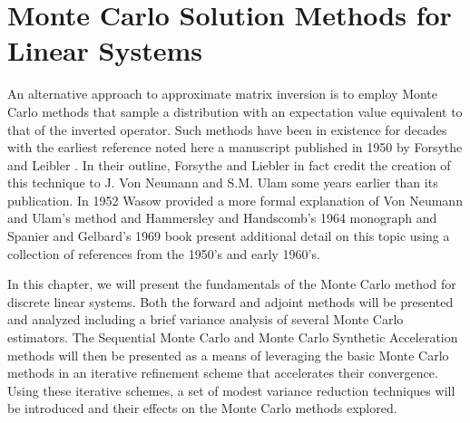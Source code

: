 \chapter{Monte Carlo Solution Methods for Linear Systems}
\label{ch:stochastic_methods}
An alternative approach to approximate matrix inversion is to employ
Monte Carlo methods that sample a distribution with an expectation
value equivalent to that of the inverted operator. Such methods have
been in existence for decades with the earliest reference noted here a
manuscript published in 1950 by Forsythe and Leibler
\citep{forsythe_matrix_1950}. In their outline, Forsythe and Liebler
in fact credit the creation of this technique to J. Von Neumann and
S.M. Ulam some years earlier than its publication. In 1952 Wasow
provided a more formal explanation of Von Neumann and Ulam's method
\citep{wasow_note_1952} and Hammersley and Handscomb's 1964 monograph
\citep{hammersley_monte_1964} and Spanier and Gelbard's 1969 book
\citep{spanier_monte_1969} present additional detail on this topic
using a collection of references from the 1950's and early 1960's.

In this chapter, we will present the fundamentals of the Monte Carlo
method for discrete linear systems. Both the forward and adjoint
methods will be presented and analyzed including a brief variance
analysis of several Monte Carlo estimators. The Sequential Monte Carlo
and Monte Carlo Synthetic Acceleration methods will then be presented
as a means of leveraging the basic Monte Carlo methods in an iterative
refinement scheme that accelerates their convergence. Using these
iterative schemes, a set of modest variance reduction techniques will
be introduced and their effects on the Monte Carlo methods explored.

